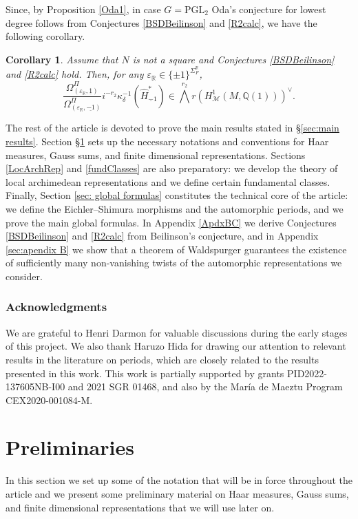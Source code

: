 \documentclass{amsart}
\newtheorem{corollary}[theorem]{Corollary}
\theoremstyle{definition}
\theoremstyle{remark}
\numberwithin{equation}{section}
\newcommand{\PGL}{{\mathrm{PGL}}}
\newcommand{\Q}{{\mathbb Q}}
\newcommand{\R}{{\mathbb R}}
\newcommand{\cM}{{\mathcal M}}
\begin{document}
Since, by Proposition \ref{Oda1}, in case $G=\PGL_2$ Oda's conjecture for lowest degree follows from Conjectures  \ref{BSDBeilinson} and \ref{R2calc}, we have the following corollary.
\begin{corollary}
Assume that $N$ is not a square and Conjectures \ref{BSDBeilinson} and \ref{R2calc} hold. Then, for any $\varepsilon_\R\in\{\pm 1\}^{\Sigma_F^\R}$,
\[
 \frac{\Omega_{(\varepsilon_\R,\underline 1)}^\Pi}{\Omega_{(\varepsilon_\R,\underline{-1})}^\Pi}i^{-r_2}\kappa_\delta^{-1}\left(\hat H_{{\underline -1}}^\ast\right)\in \bigwedge^{r_2}r\left(H^1_{\cM}(M,\Q(1))\right)^\vee.
\]
\end{corollary} 

The rest of the article is devoted to prove the main results stated in \S\ref{sec:main results}. Section \S\ref{sec: preliminaries} sets up the necessary notations and conventions for Haar measures, Gauss sums, and finite dimensional representations. Sections \ref{LocArchRep} and \ref{fundClasses}   are also preparatory: we develop the theory of local archimedean representations and we define certain fundamental classes. Finally, Section \ref{sec: global formulas} constitutes the technical core of the article: we define the Eichler--Shimura morphisms and the automorphic periods, and we prove the main global formulas. In Appendix \ref{ApdxBC} we derive Conjectures \ref{BSDBeilinson} and \ref{R2calc} from Beilinson's conjecture, and in Appendix \ref{sec:apendix B} we show that a theorem of Waldspurger guarantees the existence of sufficiently many non-vanishing twists of the automorphic representations we consider.

\subsubsection*{Acknowledgments} We are grateful to Henri Darmon for valuable discussions during the early stages of this project. We also thank Haruzo Hida for drawing our attention to relevant results in the literature on periods, which are closely related to the results presented in this work.  This work is partially supported by grants PID2022-137605NB-I00 and 2021 SGR 01468, and also by the María de Maeztu Program CEX2020-001084-M.
\section{Preliminaries}\label{sec: preliminaries}

In this section we set up some of the notation that will be in force throughout the article and we present some preliminary material on Haar measures, Gauss sums, and finite dimensional representations that we will use later on.
\end{document}
